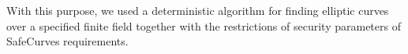 With this purpose, we used a deterministic algorithm for finding elliptic curves over a specified finite field together
with the restrictions of security parameters of SafeCurves requirements. %
